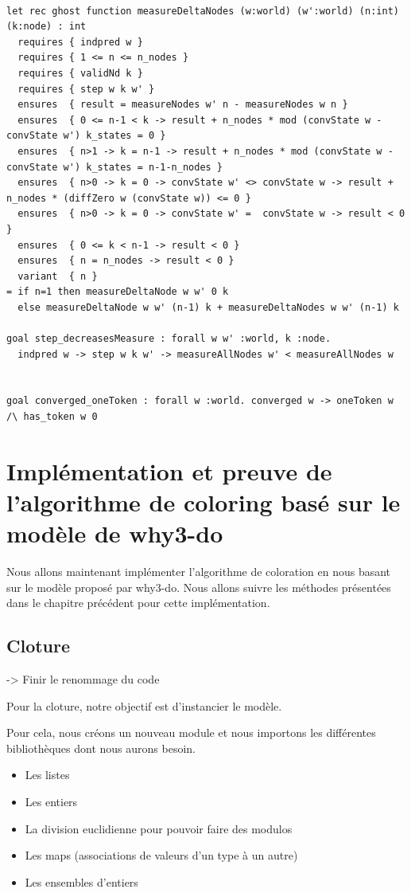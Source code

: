 \documentclass[11pt]{article}
\begin{document}
\lstset{language=why3,label= ,caption= ,captionpos=b,numbers=none}
\begin{lstlisting}

let rec ghost function measureDeltaNodes (w:world) (w':world) (n:int) (k:node) : int
  requires { indpred w }
  requires { 1 <= n <= n_nodes }
  requires { validNd k }
  requires { step w k w' }
  ensures  { result = measureNodes w' n - measureNodes w n }
  ensures  { 0 <= n-1 < k -> result + n_nodes * mod (convState w - convState w') k_states = 0 }
  ensures  { n>1 -> k = n-1 -> result + n_nodes * mod (convState w - convState w') k_states = n-1-n_nodes }
  ensures  { n>0 -> k = 0 -> convState w' <> convState w -> result + n_nodes * (diffZero w (convState w)) <= 0 }
  ensures  { n>0 -> k = 0 -> convState w' =  convState w -> result < 0 }
  ensures  { 0 <= k < n-1 -> result < 0 }
  ensures  { n = n_nodes -> result < 0 }
  variant  { n }
= if n=1 then measureDeltaNode w w' 0 k
  else measureDeltaNode w w' (n-1) k + measureDeltaNodes w w' (n-1) k

goal step_decreasesMeasure : forall w w' :world, k :node.
  indpred w -> step w k w' -> measureAllNodes w' < measureAllNodes w


goal converged_oneToken : forall w :world. converged w -> oneToken w /\ has_token w 0

\end{lstlisting}

\section{Implémentation et preuve de l’algorithme de coloring basé sur le modèle de why3-do}
\label{sec:orgc4ed998}

Nous allons maintenant implémenter l'algorithme de coloration en nous basant sur le modèle proposé par why3-do.
Nous allons suivre les méthodes présentées dans le chapitre précédent pour cette implémentation.

\subsection{Cloture}
\label{sec:orgf5f422d}
-> Finir le renommage du code

Pour la cloture, notre objectif est d'instancier le modèle. 

Pour cela, nous créons un nouveau module et nous importons les différentes bibliothèques dont nous aurons besoin. 
\begin{itemize}
\item Les listes
\item Les entiers
\item La division euclidienne pour pouvoir faire des modulos
\item Les maps (associations de valeurs d'un type à un autre)
\item Les ensembles d'entiers
\end{itemize}
\end{document}
